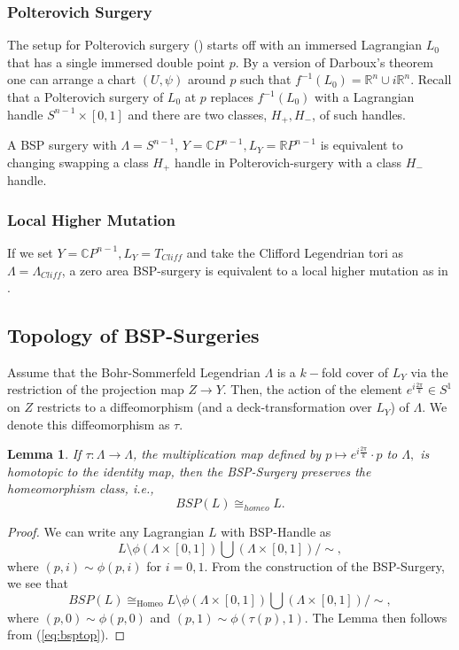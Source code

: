 \documentclass[11pt, oneside,dvipsnames]{amsart}
\renewcommand{\to}{\rightarrow}
\newcommand{\inv}{^{-1}}
\newcommand{\interval}{[0,1]}
\renewcommand{\to}{\rightarrow}
\newcommand{\<}{\langle}
\renewcommand{\>}{\rangle}
\newcommand{\bC}{\mathbb{C}}
\newcommand{\bR}{\mathbb{R}}
\newcommand{\sm}{\ensuremath{\setminus}}
\renewcommand{\to}{\rightarrow}
\newtheorem{lemma}[Theorem]{Lemma}
\theoremstyle{definition}
\theoremstyle{definition}
\numberwithin{equation}{subsection}
\begin{document}
\subsubsection{Polterovich Surgery}
The setup for Polterovich surgery (\cite{pol:surg}) starts off with an immersed Lagrangian $L_0$ that has  a single immersed double point $p$. By a version of Darboux's theorem one can arrange a chart $(U,\psi)$ around $p$ such that $f\inv (L_0) = \bR^n \cup i\bR^n.$ Recall that a Polterovich surgery of $L_0$ at $p$ replaces $f\inv( L_0)$ with a Lagrangian handle $S^{n-1}\times [0,1]$ and there are two classes, $H_+, H_-$, of such handles.

\noindent A BSP surgery with $\Lambda= S^{n-1}$, $Y= \bC P^{n-1}, L_Y = \bR P^{n-1}$ is equivalent to changing swapping a class $H_+$ handle in Polterovich-surgery with a class $H_-$ handle.


\subsubsection{ Local Higher Mutation}
If we set $Y = \bC P^{n-1}, L_Y = T_{Cliff} $ and take the Clifford Legendrian tori as $\Lambda = \Lambda_{Cliff}$, a zero area BSP-surgery is equivalent to a local higher mutation as in \cite{Cha23}.


\subsection{Topology of BSP-Surgeries}\label{sec:topsurger}

Assume that the Bohr-Sommerfeld Legendrian  $\Lambda$ is a $k-$fold cover of $L_Y$ via the restriction of the projection map $Z \to Y$.  Then, the  action of the element $e^{i\frac{2\pi}{k}} \in S^1$ on $Z$ restricts to a diffeomorphism (and a deck-transformation over $L_Y$) of $\Lambda$. We denote this diffeomorphism as $\tau$.


\begin{lemma}
    If $\tau : \Lambda \to \Lambda$, the multiplication map defined by $p \mapsto e^{i\frac{2\pi}{k}}\cdot p$ to $\Lambda,$ is homotopic to the identity map, then the BSP-Surgery preserves the homeomorphism class, i.e., $$BSP(L) \cong_{homeo} L.$$
\end{lemma}
\begin{proof}
We can write any Lagrangian $L$ with BSP-Handle as $$L\sm \phi(\Lambda \times \interval) \bigcup (\Lambda \times \interval)/\sim, $$ where $(p,i) \sim \phi(p,i)$ for $i=0,1$. From the construction of the BSP-Surgery, we see that 
\begin{equation} \label{eq:bsptop}
BSP(L) \cong_{\text{Homeo}} L\sm \phi(\Lambda \times \interval) \bigcup (\Lambda \times \interval)/\sim, 
\end{equation}where $(p,0) \sim \phi(p,0)$ and $(p,1) \sim \phi(\tau(p),1)$. 
The Lemma then  follows from (\ref{eq:bsptop}).
\end{proof}
\end{document}
